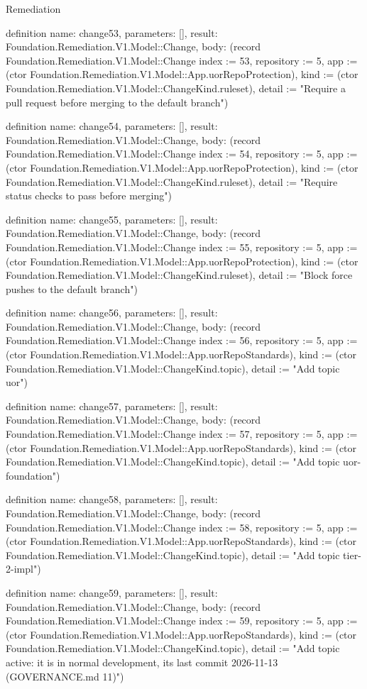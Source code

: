 \begin{lexlean}{Remediation}
\begin{semanticmodule}
definition{
  name: change53,
  parameters: [],
  result: Foundation.Remediation.V1.Model::Change,
  body: (record Foundation.Remediation.V1.Model::Change {index := 53, repository := 5, app := (ctor Foundation.Remediation.V1.Model::App.uorRepoProtection), kind := (ctor Foundation.Remediation.V1.Model::ChangeKind.ruleset), detail := "Require a pull request before merging to the default branch"})
}

definition{
  name: change54,
  parameters: [],
  result: Foundation.Remediation.V1.Model::Change,
  body: (record Foundation.Remediation.V1.Model::Change {index := 54, repository := 5, app := (ctor Foundation.Remediation.V1.Model::App.uorRepoProtection), kind := (ctor Foundation.Remediation.V1.Model::ChangeKind.ruleset), detail := "Require status checks to pass before merging"})
}

definition{
  name: change55,
  parameters: [],
  result: Foundation.Remediation.V1.Model::Change,
  body: (record Foundation.Remediation.V1.Model::Change {index := 55, repository := 5, app := (ctor Foundation.Remediation.V1.Model::App.uorRepoProtection), kind := (ctor Foundation.Remediation.V1.Model::ChangeKind.ruleset), detail := "Block force pushes to the default branch"})
}

definition{
  name: change56,
  parameters: [],
  result: Foundation.Remediation.V1.Model::Change,
  body: (record Foundation.Remediation.V1.Model::Change {index := 56, repository := 5, app := (ctor Foundation.Remediation.V1.Model::App.uorRepoStandards), kind := (ctor Foundation.Remediation.V1.Model::ChangeKind.topic), detail := "Add topic uor"})
}

definition{
  name: change57,
  parameters: [],
  result: Foundation.Remediation.V1.Model::Change,
  body: (record Foundation.Remediation.V1.Model::Change {index := 57, repository := 5, app := (ctor Foundation.Remediation.V1.Model::App.uorRepoStandards), kind := (ctor Foundation.Remediation.V1.Model::ChangeKind.topic), detail := "Add topic uor-foundation"})
}

definition{
  name: change58,
  parameters: [],
  result: Foundation.Remediation.V1.Model::Change,
  body: (record Foundation.Remediation.V1.Model::Change {index := 58, repository := 5, app := (ctor Foundation.Remediation.V1.Model::App.uorRepoStandards), kind := (ctor Foundation.Remediation.V1.Model::ChangeKind.topic), detail := "Add topic tier-2-impl"})
}

definition{
  name: change59,
  parameters: [],
  result: Foundation.Remediation.V1.Model::Change,
  body: (record Foundation.Remediation.V1.Model::Change {index := 59, repository := 5, app := (ctor Foundation.Remediation.V1.Model::App.uorRepoStandards), kind := (ctor Foundation.Remediation.V1.Model::ChangeKind.topic), detail := "Add topic active: it is in normal development, its last commit 2026-11-13 (GOVERNANCE.md 11)"})
}


\end{semanticmodule}
\end{lexlean}
